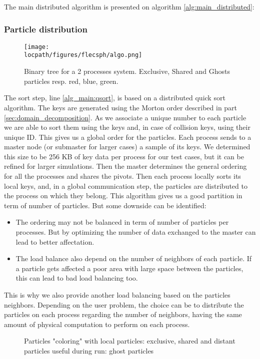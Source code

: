 The main distributed algorithm is presented on algorithm \ref{alg:main_distributed}:

\subsubsection{Particle distribution}

\begin{figure*}
\centering
\texttt{[image: \\locpath/figures/flecsph/algo.png]}
\caption{Binary tree for a 2 processes system. Exclusive, Shared and Ghosts particles resp. red, blue, green.}
\label{fig:big_tree}
\end{figure*}

The sort step, line \ref{alg_main:qsort}, is based on a distributed quick sort algorithm. 
The keys are generated using the Morton order described in part \ref{sec:domain_decomposition}. 
As we associate a unique number to each particle we are able to sort them using the keys and, in case of collision keys, using their unique ID. 
This gives us a global order for the particles. 
Each process sends to a master node (or submaster for larger cases) a sample of its keys. 
We determined this size to be 256 KB of key data per process for our test cases, but it can be refined for larger simulations. 
Then the master determines the general ordering for all the processes and shares the pivots. 
Then each process locally sorts its local keys, and, in a global communication step, the particles are distributed to the process on which they belong. 
This algorithm gives us a good partition in term of number of particles. 
But some downside can be identified:
\begin{itemize}
	\item The ordering may not be balanced in term of number of particles per processes. But by optimizing the number of data exchanged to the master can lead to better affectation. 
	\item The load balance also depend on the number of neighbors of each particle. If a particle gets affected a poor area with large space between the particles, this can lead to bad load balancing too. 
\end{itemize}
This is why we also provide another load balancing based on the particles neighbors. 
Depending on the user problem, the choice can be to distribute the particles on each process regarding the number of neighbors, having the same amount of physical computation to perform on each process. 

\begin{figure}[t!]
\centering

\caption{Particles "coloring" with local particles: exclusive, shared and distant particles useful during run: ghost particles}
\label{fig:coloring_particles}
\end{figure}

